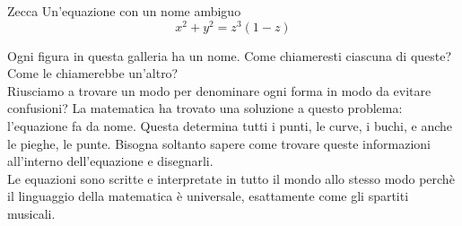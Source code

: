 \begin{surferPage}{Zecca}
Un'equazione con un nome ambiguo \\
\smallskip
\[x^2 + y^2	= z^3	(1 - z) \]


\singlespacing
Ogni figura in questa galleria ha un nome. Come chiameresti ciascuna di queste? Come le chiamerebbe un'altro?\\
\vspace{0.3cm}
Riusciamo a trovare un modo per denominare ogni forma in modo da evitare confusioni? La matematica ha trovato una soluzione a questo problema: l'equazione fa da nome. Questa determina tutti i punti, le curve, i buchi, e anche le pieghe, le punte. Bisogna soltanto sapere come trovare queste informazioni all'interno dell'equazione e disegnarli.\\
\vspace{0.3cm}
Le equazioni sono scritte e interpretate in tutto il mondo allo stesso modo perch\`e il linguaggio della matematica \`e universale, esattamente come gli spartiti musicali.
\end{surferPage}
